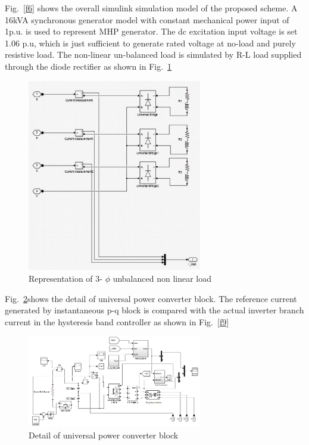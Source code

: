 \documentclass[journal,twoside]{IEEEtran}
\begin{document}
Fig.~\ref{f6} shows the overall simulink simulation model of the
proposed scheme. A 16kVA synchronous generator model with
constant mechanical power input of 1p.u. is used to represent
MHP generator. The dc excitation input voltage is set 1.06 p.u,
which is just sufficient to generate rated voltage at no-load and
purely resistive load. The non-linear un-balanced load is
simulated by R-L load supplied through the diode rectifier as
shown in Fig.~\ref{f7}

\begin{figure}[!ht]
\centering
\includegraphics[width=3in]{7}
\caption{Representation of 3- $\phi$ unbalanced non linear load}
\label{f7}
\end{figure}
Fig.~\ref{f8}shows the detail of universal power converter block. The
reference current generated by instantaneous p-q block is
compared with the actual inverter branch current in the
hysteresis band controller as shown in Fig.~\ref{f9}

\begin{figure}[!ht]
\centering
\includegraphics[width=3in]{8}
\caption{Detail of universal power converter block}
\label{f8}
\end{figure}
\end{document}
